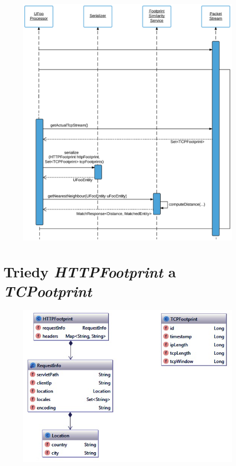 \documentclass[
  digital, %
  table,   %
  lof,     %
  nolot,   %
  nocover
]{fithesis3}
\begin{document}
\begin{figure}[h]
  \centering
    \includegraphics[width=1.1\textwidth]{images/footprint-impl-flow-2.png}
\end{figure}

\chapter{Triedy \textit{HTTPFootprint} a \textit{TCPootprint}}
\label{fig:appendix-structure}
\begin{figure}[h]
  \centering
    \includegraphics[width=\textwidth]{images/appendix-structure.png}
\end{figure}
\end{document}
